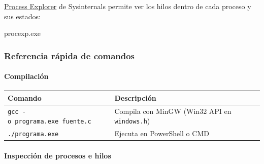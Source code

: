 \documentclass[
  spanish,
]{article}
\newenvironment{Shaded}{}{}
\newcommand{\NormalTok}[1]{#1}
\newcounter{none} %
\begin{document}
\href{https://docs.microsoft.com/en-us/sysinternals/downloads/process-explorer}{Process
Explorer} de Sysinternals permite ver los hilos dentro de cada proceso y
sus estados:

\begin{Shaded}
\begin{Highlighting}[]
\NormalTok{procexp.exe}
\end{Highlighting}
\end{Shaded}

\subsubsection{Referencia rápida de
comandos}\label{referencia-ruxe1pida-de-comandos}

\paragraph{Compilación}\label{compilaciuxf3n}

{\def\LTcaptype{none} %
\begin{longtable}[]{@{}
  >{\raggedright\arraybackslash}p{}
  >{\raggedright\arraybackslash}p{}@{}}
\toprule\noalign{}
\begin{minipage}[b]{\linewidth}\raggedright
Comando
\end{minipage} & \begin{minipage}[b]{\linewidth}\raggedright
Descripción
\end{minipage} \\
\midrule\noalign{}
\endhead
\bottomrule\noalign{}
\endlastfoot
\texttt{gcc\ -o\ programa.exe\ fuente.c} & Compila con MinGW (Win32 API
en \texttt{windows.h}) \\
\texttt{./programa.exe} & Ejecuta en PowerShell o CMD \\
\end{longtable}
}

\paragraph{Inspección de procesos e
hilos}\label{inspecciuxf3n-de-procesos-e-hilos}
\end{document}

